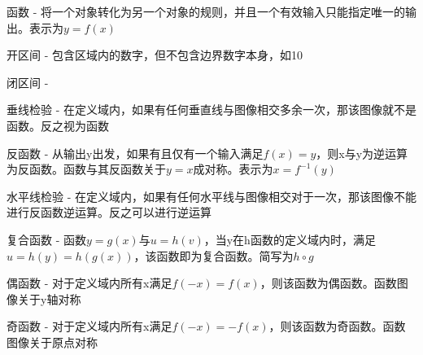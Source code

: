 \documentclass[UTF8,fontset=ubuntu]{ctexart}
\begin{document}
函数 - 将一个对象转化为另一个对象的规则，并且一个有效输入只能指定唯一的输出。表示为$y=f(x)$

开区间 - 包含区域内的数字，但不包含边界数字本身，如10

闭区间 - 

垂线检验 - 在定义域内，如果有任何垂直线与图像相交多余一次，那该图像就不是函数。反之视为函数

反函数 - 从输出y出发，如果有且仅有一个输入满足$f(x)=y$，则x与y为逆运算为反函数。函数与其反函数关于$y=x$成对称。表示为$x=f^{-1}(y)$

水平线检验 - 在定义域内，如果有任何水平线与图像相交对于一次，那该图像不能进行反函数逆运算。反之可以进行逆运算

复合函数 - 函数$y=g(x)$与$u=h(v)$，当y在h函数的定义域内时，满足$u=h(y)=h(g(x))$，该函数即为复合函数。简写为$h \circ g$

偶函数 - 对于定义域内所有x满足$f(-x)=f(x)$，则该函数为偶函数。函数图像关于y轴对称

奇函数 - 对于定义域内所有x满足$f(-x)=-f(x)$，则该函数为奇函数。函数图像关于原点对称
\end{document}
